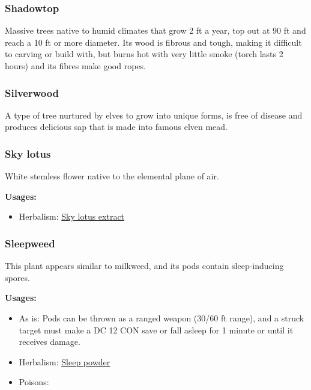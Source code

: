 \subsubsection{Shadowtop}

Massive trees native to humid climates that grow 2 ft a year, top out at 90 ft and reach a 10 ft or more diameter. Its wood is fibrous and tough, making it difficult to carving or build with, but burns hot with very little smoke (torch lasts 2 hours) and its fibres make good ropes.

\subsubsection{Silverwood}

A type of tree nurtured by elves to grow into unique forms, is free of disease and produces delicious sap that is made into famous elven mead.

\subsubsection{Sky lotus}
\label{Sky lotus}

White stemless flower native to the elemental plane of air.

\vspace{5mm}

\textbf{Usages:}

\begin{itemize}[noitemsep]
\item[] Herbalism: \hyperref[Sky lotus extract]{Sky lotus extract}
\end{itemize}

\subsubsection{Sleepweed}
\label{Sleepweed}

This plant appears similar to milkweed, and its pods contain sleep-inducing spores.

\vspace{5mm}

\textbf{Usages:}

\begin{itemize}[noitemsep]
\item[] As is: Pods can be thrown as a ranged weapon (30/60 ft range), and a struck target must make a DC 12 CON save or fall asleep for 1 minute or until it receives damage.
\item[] Herbalism: \hyperref[Sleep powder]{Sleep powder}
\item[] Poisons: \poison
\end{itemize}

